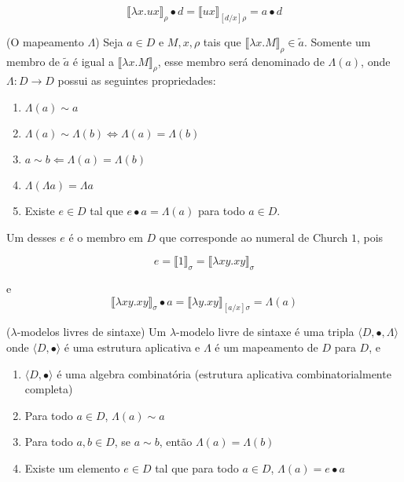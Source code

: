 \documentclass[../main.tex]{subfiles}
\begin{document}
$$\llbracket \lambda x . ux \rrbracket_{\rho} \bullet d = \llbracket ux \rrbracket_{[d/x]\rho} = a \bullet d$$

\begin{definition}(O mapeamento $\Lambda$)
    Seja $a \in D$ e $M, x, \rho$ tais que $\llbracket \lambda x . M \rrbracket_{\rho} \in \tilde{a}$. Somente um membro de $\tilde{a}$ é igual a $\llbracket \lambda x . M \rrbracket_{\rho}$, esse membro será denominado de $\Lambda(a)$, onde $\Lambda : D \to D$ possui as seguintes propriedades:
    \begin{enumerate}
        \item $\Lambda(a) \sim a$
        \item $\Lambda(a) \sim \Lambda(b) \Longleftrightarrow \Lambda(a) = \Lambda(b)$
        \item $a \sim b \Longleftarrow \Lambda(a) = \Lambda(b)$
        \item $\Lambda (\Lambda a) = \Lambda a$
        \item Existe $e \in D$ tal que $e \bullet a = \Lambda (a)$ para todo $a \in D$.
    \end{enumerate}
\end{definition}

Um desses $e$ é o membro em $D$ que corresponde ao numeral de Church $1$, pois

$$e = \llbracket 1 \rrbracket_{\sigma} = \llbracket \lambda xy . xy \rrbracket_{\sigma}$$

e $$\llbracket \lambda xy . xy \rrbracket_{\sigma} \bullet a = \llbracket \lambda y . xy \rrbracket_{[a/x]\sigma} = \Lambda(a)$$

\begin{definition}($\lambda$-modelos livres de sintaxe)
    Um $\lambda$-modelo livre de sintaxe é uma tripla $\langle D, \bullet, \Lambda \rangle$ onde $\langle D, \bullet \rangle$ é uma estrutura aplicativa e $\Lambda$ é um mapeamento de $D$ para $D$, e
    \begin{enumerate}
        \item $\langle D, \bullet \rangle$ é uma algebra combinatória (estrutura aplicativa combinatorialmente completa)
        \item Para todo $a \in D$, $\Lambda(a) \sim a$
        \item Para todo $a, b \in D$, se $a \sim b$, então $\Lambda (a) = \Lambda (b)$ 
        \item Existe um elemento $e \in D$ tal que para todo $a \in D$, $\Lambda (a) = e \bullet a$
    \end{enumerate}
\end{definition}
\end{document}

